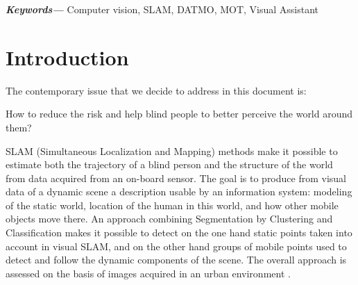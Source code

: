\documentclass[conference,compsoc]{IEEEtran}
\providecommand{\keywords}[1]
{
  \small	
  \textbf{\textit{Keywords---}} #1
}
\begin{document}
\keywords{Computer vision, SLAM, DATMO, MOT, Visual Assistant}



%
\IEEEpeerreviewmaketitle



\section{Introduction}
The contemporary issue that we decide to address in this document is:

How to reduce the risk and help blind people to better perceive the world around them?

SLAM (Simultaneous Localization and Mapping) \cite{mozos2007interest} methods make it possible to estimate both the trajectory of a blind person and the structure of the world from data acquired from an on-board sensor. The goal is to produce from visual data of a dynamic scene a description usable by an information system: modeling of the static world, location of the human in this world, and how other mobile objects move there. An approach combining Segmentation by Clustering and Classification makes it possible to detect on the one hand static points taken into account in visual SLAM, and on the other hand groups of mobile points used to detect and follow the dynamic components of the scene. The overall approach is assessed on the basis of images acquired in an urban environment \cite{gil2010comparative}.
\end{document}
